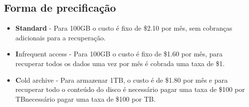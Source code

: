 \documentclass[a4paper,12pt]{article}
\begin{document}
\subsection*{Forma de precificação}

\begin{itemize}
  
  \item\textbf{Standard} - Para 100GB o custo é fixo de \$2.10 por mês, sem cobranças adicionais para a recuperação.
  \item\textbf Infrequent access - Para 100GB o custo é fixo de \$1.60 por mês, para recuperar todos os dados uma vez por mês é cobrada uma taxa de \$1.
  \item\textbf Cold archive - Para armazenar 1TB, o custo é de \$1.80 por mês e para recuperar todo o conteúdo do disco é necessário pagar uma taxa de \$100 por TBnecessário pagar uma taxa de \$100 por TB.
\end{itemize}
\end{document}
